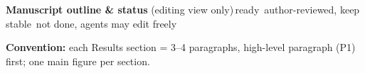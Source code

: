 \begingroup
\footnotesize
\renewcommand{\labelitemi}{}\renewcommand{\labelitemii}{}\renewcommand{\labelitemiii}{}
\setlength{\leftmargini}{1.1em}\setlength{\leftmarginii}{1.1em}\setlength{\leftmarginiii}{1.1em}
\setlength{\parskip}{1pt}
{\normalsize\bfseries Manuscript outline \& status}\quad
{\scriptsize(editing view only)\quad {}\,ready \enspace {}\,author-reviewed, keep stable \enspace {}\,not done, agents may edit freely}\par\vspace{1pt}
{\scriptsize\textbf{Convention:} each Results section = 3--4 paragraphs, high-level paragraph (P1) first; one main figure per section.}\par\vspace{1pt}


